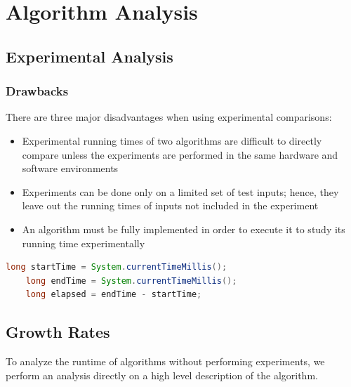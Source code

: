 \documentclass[../Main.tex]{subfiles}
\begin{document}
\chapter{Algorithm Analysis}

\intro{

}

\section{Experimental Analysis}
\subsection{Drawbacks}
There are three major disadvantages when using experimental comparisons:
\begin{itemize}
    \item Experimental running times of two algorithms are difficult to directly compare unless the experiments are performed in the same hardware and software environments
    \item Experiments can be done only on a limited set of test inputs; hence, they leave out the running times of inputs not included in the experiment
    \item An algorithm must be fully implemented in order to execute it to study its running time experimentally
\end{itemize}

\begin{lstlisting}[language=Java, caption=Example Measurement]
    long startTime = System.currentTimeMillis();
    long endTime = System.currentTimeMillis();
    long elapsed = endTime - startTime;
\end{lstlisting}

\section{Growth Rates}
To analyze the runtime of algorithms without performing experiments, we perform an analysis directly on
a high level description of the algorithm.

\end{document}
